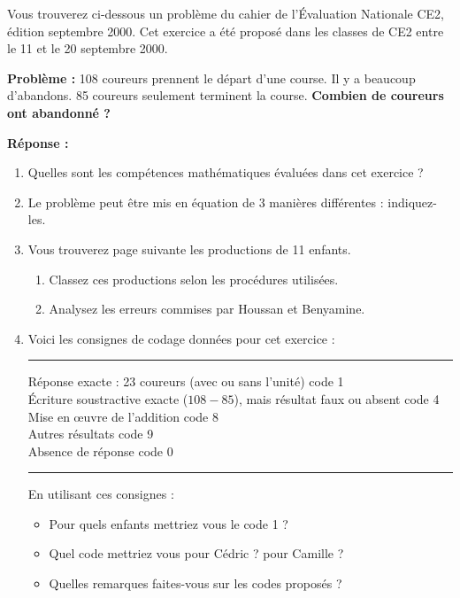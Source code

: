 \bigskip


\begin{exercice}
Vous trouverez ci-dessous un problème du cahier de l'Évaluation Nationale CE2, édition septembre 2000. Cet exercice a été proposé dans les classes de CE2 entre le 11 et le 20 septembre 2000.
\begin{center}
   \it
   \begin{minipage}{13cm}
   {\bf Problème :} 108 coureurs prennent le départ d'une course. Il y a beaucoup d'abandons. 85 coureurs seulement terminent la course. {\bf Combien de coureurs ont abandonné ?}
      \begin{center}
      \end{center}
   {\bf Réponse :} \dotfill
   \end{minipage}
\end{center}
\begin{enumerate}
   \item Quelles sont les compétences mathématiques évaluées dans cet exercice ?
   \item Le problème peut être mis en équation de 3 manières différentes : indiquez-les.
   \item Vous trouverez page suivante les productions de 11 enfants.
   \begin{enumerate}
      \item Classez ces productions selon les procédures utilisées.
      \item Analysez les erreurs commises par Houssan et Benyamine.
   \end{enumerate}
   \item Voici les consignes de codage données pour cet exercice :
   \begin{center}
   \smallskip
   \hrule
   \smallskip
   Réponse exacte : 23 coureurs (avec ou sans l'unité) \dotfill code 1 \\
   Écriture soustractive exacte ($108-85$), mais résultat faux ou absent  \dotfill code 4 \\
   Mise en \oe uvre de l'addition \dotfill code 8 \\
   Autres résultats \dotfill code 9 \\
   Absence de réponse \dotfill code 0 \\
   \smallskip
   \hrule
   \smallskip
   \end{center}
En utilisant ces consignes :
\begin{itemize}
   \item Pour quels enfants mettriez vous le code 1 ?
   \item Quel code mettriez vous pour Cédric ? pour Camille ?
   \item Quelles remarques faites-vous sur les codes proposés ?
\end{itemize}
\end{enumerate}
\end{exercice}

